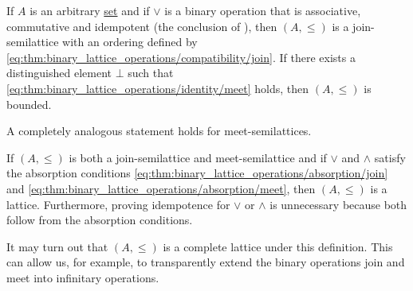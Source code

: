 \begin{proposition}
\begin{thmenum}
     If \( A \) is an arbitrary \hyperref[def:set]{set} and if \( \vee \) is a binary operation that is associative, commutative and idempotent (the conclusion of ), then \( (A, \leq) \) is a join-semilattice with an ordering defined by \eqref{eq:thm:binary_lattice_operations/compatibility/join}. If there exists a distinguished element \( \bot \) such that \eqref{eq:thm:binary_lattice_operations/identity/meet} holds, then \( (A, \leq) \) is bounded.

    A completely analogous statement holds for meet-semilattices.

    If \( (A, \leq) \) is both a join-semilattice and meet-semilattice and if \( \vee \) and \( \wedge \) satisfy the absorption conditions \eqref{eq:thm:binary_lattice_operations/absorption/join} and \eqref{eq:thm:binary_lattice_operations/absorption/meet}, then \( (A, \leq) \) is a lattice. Furthermore, proving idempotence for \( \vee \) or \( \wedge \) is unnecessary because both follow from the absorption conditions.

    It may turn out that \( (A, \leq) \) is a complete lattice under this definition. This can allow us, for example, to transparently extend the binary operations join and meet into infinitary operations.
  \end{thmenum}
\end{proposition}
